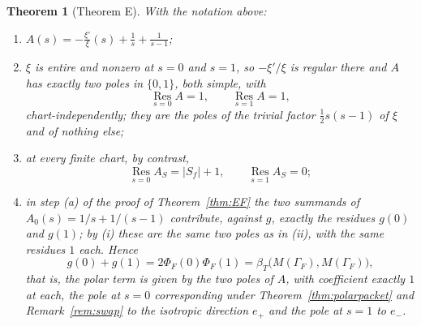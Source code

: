 \documentclass[11pt]{amsart}
\newtheorem{theorem}{Theorem}[section]
\theoremstyle{definition}
\theoremstyle{remark}
\newcommand{\Res}{\operatorname*{Res}}
\begin{document}
\begin{theorem}[Theorem E]
\label{thm:residues}
With the notation above:
\begin{enumerate}
\item[(i)] $\displaystyle A(s)=-\frac{\xi'}{\xi}(s)+\frac1s+\frac1{s-1}$;
\item[(ii)] $\xi$ is entire and nonzero at $s=0$ and $s=1$, so $-\xi'/\xi$ is
regular there and $A$ has exactly two poles in $\{0,1\}$, both simple, with
\begin{equation}
  \Res_{s=0}A=1,\qquad \Res_{s=1}A=1 ,
\tag{10.3}
\end{equation}
chart-independently; they are the poles of the trivial factor $\tfrac12s(s-1)$
of $\xi$ and of nothing else;
\item[(iii)] at every finite chart, by contrast,
\begin{equation}
  \Res_{s=0}A_S=|S_f|+1,\qquad \Res_{s=1}A_S=0 ;
\tag{10.4}
\end{equation}
\item[(iv)] in step \emph{(a)} of the proof of Theorem~\emph{\ref{thm:EF}} the
two summands of $A_0(s)=1/s+1/(s-1)$ contribute, against $g$, exactly the
residues $g(0)$ and $g(1)$; by \emph{(i)} these are the same two poles as in
\emph{(ii)}, with the same residues $1$ each.  Hence
\[
  g(0)+g(1)=2\Phi_F(0)\Phi_F(1)
  =\beta_T\bigl(M(\Gamma_F),M(\Gamma_F)\bigr),
\]
that is, the polar term is given by the two poles of $A$, with coefficient
exactly $1$ at each, the pole at $s=0$ corresponding under
Theorem~\emph{\ref{thm:polarpacket}} and Remark~\emph{\ref{rem:swap}} to the
isotropic direction $e_+$ and the pole at $s=1$ to $e_-$.
\end{enumerate}
\end{theorem}
\end{document}
